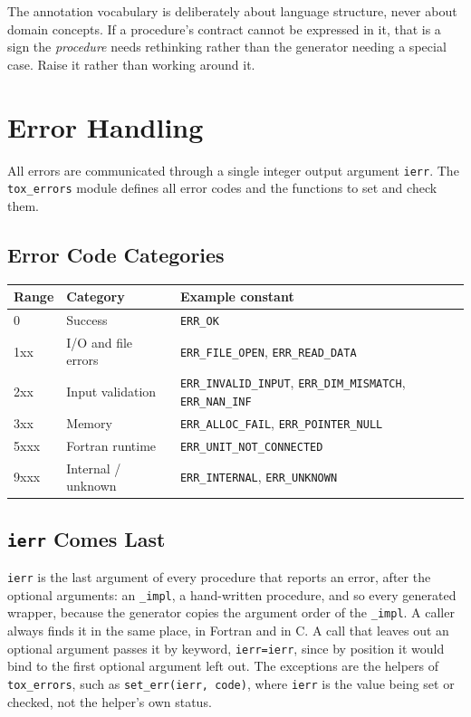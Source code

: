 \documentclass{article}
\begin{document}
The annotation vocabulary is deliberately about language structure, never about domain concepts. If
a procedure's contract cannot be expressed in it, that is a sign the \emph{procedure} needs
rethinking rather than the generator needing a special case. Raise it rather than working around it.

\section{Error Handling}

All errors are communicated through a single integer output argument \texttt{ierr}. The \texttt{tox\_errors} module defines all error codes and the functions to set and check them.

\subsection{Error Code Categories}

\begin{tabular}{lll}
\toprule
Range & Category & Example constant \\
\midrule
0 & Success & \texttt{ERR\_OK} \\
1xx & I/O and file errors & \texttt{ERR\_FILE\_OPEN}, \texttt{ERR\_READ\_DATA} \\
2xx & Input validation & \texttt{ERR\_INVALID\_INPUT}, \texttt{ERR\_DIM\_MISMATCH}, \texttt{ERR\_NAN\_INF} \\
3xx & Memory & \texttt{ERR\_ALLOC\_FAIL}, \texttt{ERR\_POINTER\_NULL} \\
5xxx & Fortran runtime & \texttt{ERR\_UNIT\_NOT\_CONNECTED} \\
9xxx & Internal / unknown & \texttt{ERR\_INTERNAL}, \texttt{ERR\_UNKNOWN} \\
\bottomrule
\end{tabular}

\subsection{\texttt{ierr} Comes Last}

\texttt{ierr} is the last argument of every procedure that reports an error, after the optional
arguments: an \texttt{\_impl}, a hand-written procedure, and so every generated wrapper, because the
generator copies the argument order of the \texttt{\_impl}. A caller always finds it in the same
place, in Fortran and in C. A call that leaves out an optional argument passes it by keyword,
\texttt{ierr=ierr}, since by position it would bind to the first optional argument left out. The
exceptions are the helpers of \texttt{tox\_errors}, such as \texttt{set\_err(ierr, code)}, where
\texttt{ierr} is the value being set or checked, not the helper's own status.
\end{document}
